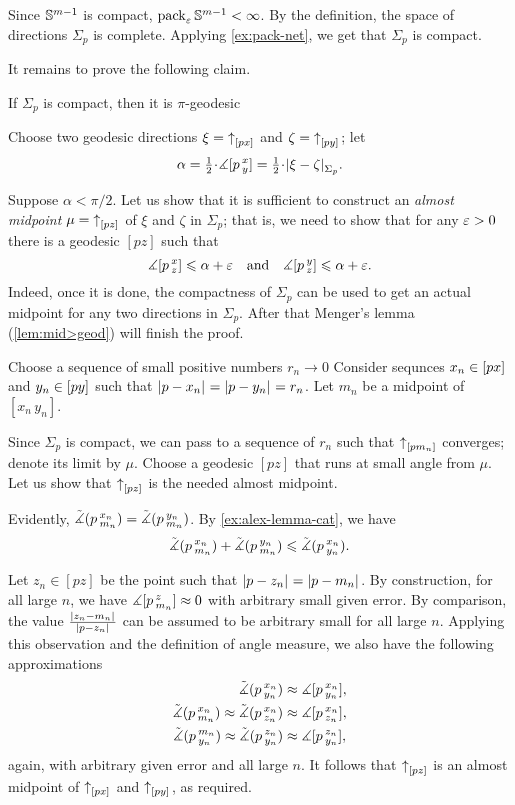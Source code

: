 Since $\mathbb{S}^{m-1}$ is compact, $\operatorname{\rm pack}\nolimits_\varepsilon\mathbb{S}^{m-1}<\infty$.
By the definition, the space of directions $\Sigma_p$ is complete. 
Applying \ref{ex:pack-net}, we get that  $\Sigma_p$ is compact.

It remains to prove the following claim.

\begin{clm}{}
If $\Sigma_p$ is compact, then it is $\pi$-geodesic
\end{clm}

Choose two geodesic directions $\xi={\uparrow}_{[{p}{x}]_{{}}}$ and $\zeta={\uparrow}_{[{p}{y}]_{{}}}$;
let 
\[\alpha\z=\tfrac12\cdot \mangle \hinge pxy=\tfrac12\cdot \dist{\xi}{\zeta}{\Sigma_p}.\]

Suppose $\alpha<\pi/2$.
Let us show that it is sufficient to construct an \emph{almost midpoint} $\mu\z=\dir pz$ of $\xi$ and $\zeta$ in $\Sigma_p$;
that is, we need to show that for any $\varepsilon>0$ there is a geodesic $[pz]$ such that
\[\measuredangle[p\,{}^{x}_{z}]\leqslant \alpha+\varepsilon
\quad\text{and}\quad
\measuredangle[p\,{}^{y}_{z}]\leqslant \alpha+\varepsilon.\]
Indeed, once it is done, the compactness of $\Sigma_p$ can be used to get an actual midpoint for any two directions in $\Sigma_p$.
After that Menger's lemma (\ref{lem:mid>geod}) will finish the proof.

Choose a sequence of small positive numbers $r_n\to0$
Consider sequnces $x_n\z\in [px]$ and $y_n\z\in [py]$ such that $\dist{p}{x_n}{}=\dist{p}{y_n}{}=r_n$.
Let $m_n$ be a midpoint of $[x_n\,y_n]$.

Since $\Sigma_p$ is compact, we can pass to a sequence of $r_n$ such that 
${\uparrow}_{[{p}{m_n}]_{{}}}$ converges;
denote its limit by $\mu$.
Choose a geodesic $[pz]$ that runs at small angle from $\mu$.
Let us show that ${\uparrow}_{[{p}{z}]_{{}}}$ is the needed almost midpoint.

Evidently, $\tilde\measuredangle(p\,{}^{x_n}_{m_n})=\tilde\measuredangle(p\,{}^{y_n}_{m_n})$.
By \ref{ex:alex-lemma-cat}, we have
\[\tilde\measuredangle(p\,{}^{x_n}_{m_n})+\tilde\measuredangle(p\,{}^{y_n}_{m_n})\leqslant \tilde\measuredangle(p\,{}^{x_n}_{y_n}).\]

Let $z_n\in [pz]$ be the point such that $\dist{p}{z_n}{}=\dist{p}{m_n}{}$.
By construction, for all large $n$, we have $\measuredangle[p\,{}^{z}_{m_n}]\approx0$  with arbitrary small given error.
By comparison, the value $\frac{\dist{z_n}{m_n}{}}{\dist{p}{z_n}{}}$ can be assumed to be arbitrary small for all large $n$.
Applying this observation and the definition of angle measure, we also have the following approximations
\begin{align*}
\tilde\measuredangle(p\,{}^{x_n}_{y_n})&\approx \measuredangle[p\,{}^{x_n}_{y_n}],
\\
\tilde\measuredangle(p\,{}^{x_n}_{m_n})\approx\tilde\measuredangle(p\,{}^{x_n}_{z_n})&\approx\measuredangle[p\,{}^{x_n}_{z_n}],
\\
\tilde\measuredangle(p\,{}^{m_n}_{y_n})\approx\tilde\measuredangle(p\,{}^{z_n}_{y_n})&\approx\measuredangle[p\,{}^{z_n}_{y_n}],
\end{align*}
again, with arbitrary given error and all large $n$.
It follows that ${\uparrow}_{[{p}{z}]_{{}}}$ is an almost midpoint of ${\uparrow}_{[{p}{x}]_{{}}}$ and ${\uparrow}_{[{p}{y}]_{{}}}$, as required.
\qeds

